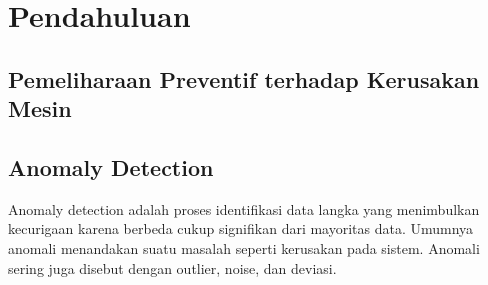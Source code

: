 \chapter{Pendahuluan}

\section{Pemeliharaan Preventif terhadap Kerusakan Mesin}

\section{Anomaly Detection}

Anomaly detection adalah proses identifikasi data langka yang menimbulkan kecurigaan karena berbeda cukup signifikan dari mayoritas data. Umumnya anomali menandakan suatu masalah seperti kerusakan pada sistem. Anomali sering juga disebut dengan outlier, noise, dan deviasi.
